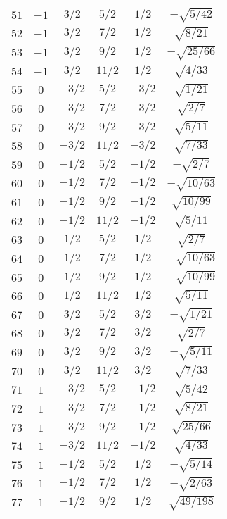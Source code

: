 \begin{table}
\begin{center}
\begin{tabular}{|c|c|c|c|c|c|}
$51$ & $-1$ & $3/2$ & $5/2$ & $1/2$ & $-\sqrt{5/42}$ \\ 
$52$ & $-1$ & $3/2$ & $7/2$ & $1/2$ & $\sqrt{8/21}$ \\ 
$53$ & $-1$ & $3/2$ & $9/2$ & $1/2$ & $-\sqrt{25/66}$ \\ 
$54$ & $-1$ & $3/2$ & $11/2$ & $1/2$ & $\sqrt{4/33}$ \\ 
$55$ & $0$ & $-3/2$ & $5/2$ & $-3/2$ & $\sqrt{1/21}$ \\ 
$56$ & $0$ & $-3/2$ & $7/2$ & $-3/2$ & $\sqrt{2/7}$ \\ 
$57$ & $0$ & $-3/2$ & $9/2$ & $-3/2$ & $\sqrt{5/11}$ \\ 
$58$ & $0$ & $-3/2$ & $11/2$ & $-3/2$ & $\sqrt{7/33}$ \\ 
$59$ & $0$ & $-1/2$ & $5/2$ & $-1/2$ & $-\sqrt{2/7}$ \\ 
$60$ & $0$ & $-1/2$ & $7/2$ & $-1/2$ & $-\sqrt{10/63}$ \\ 
$61$ & $0$ & $-1/2$ & $9/2$ & $-1/2$ & $\sqrt{10/99}$ \\ 
$62$ & $0$ & $-1/2$ & $11/2$ & $-1/2$ & $\sqrt{5/11}$ \\ 
$63$ & $0$ & $1/2$ & $5/2$ & $1/2$ & $\sqrt{2/7}$ \\ 
$64$ & $0$ & $1/2$ & $7/2$ & $1/2$ & $-\sqrt{10/63}$ \\ 
$65$ & $0$ & $1/2$ & $9/2$ & $1/2$ & $-\sqrt{10/99}$ \\ 
$66$ & $0$ & $1/2$ & $11/2$ & $1/2$ & $\sqrt{5/11}$ \\ 
$67$ & $0$ & $3/2$ & $5/2$ & $3/2$ & $-\sqrt{1/21}$ \\ 
$68$ & $0$ & $3/2$ & $7/2$ & $3/2$ & $\sqrt{2/7}$ \\ 
$69$ & $0$ & $3/2$ & $9/2$ & $3/2$ & $-\sqrt{5/11}$ \\ 
$70$ & $0$ & $3/2$ & $11/2$ & $3/2$ & $\sqrt{7/33}$ \\ 
$71$ & $1$ & $-3/2$ & $5/2$ & $-1/2$ & $\sqrt{5/42}$ \\ 
$72$ & $1$ & $-3/2$ & $7/2$ & $-1/2$ & $\sqrt{8/21}$ \\ 
$73$ & $1$ & $-3/2$ & $9/2$ & $-1/2$ & $\sqrt{25/66}$ \\ 
$74$ & $1$ & $-3/2$ & $11/2$ & $-1/2$ & $\sqrt{4/33}$ \\ 
$75$ & $1$ & $-1/2$ & $5/2$ & $1/2$ & $-\sqrt{5/14}$ \\ 
$76$ & $1$ & $-1/2$ & $7/2$ & $1/2$ & $-\sqrt{2/63}$ \\ 
$77$ & $1$ & $-1/2$ & $9/2$ & $1/2$ & $\sqrt{49/198}$ \\ 

\end{tabular}
\end{center}
\end{table}
